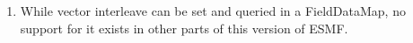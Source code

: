 

\begin{enumerate}

\item While vector interleave can be set and queried
in a FieldDataMap, no support for it exists in other
parts of this version of ESMF. 

\end{enumerate}


